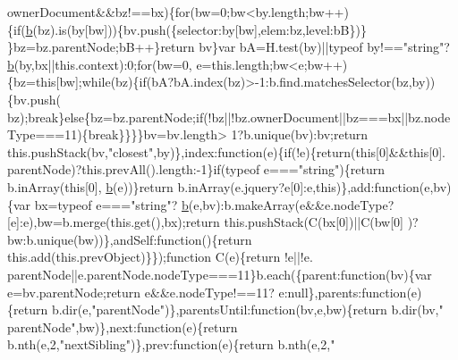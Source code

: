 \begin{DoxyCode}
{      ownerDocument&&bz!==bx)\{\textcolor{keywordflow}{for}(bw=0;bw<by.length;bw++)\{\textcolor{keywordflow}{if}(\hyperlink{jquery_8js_aa4026ad5544b958e54ce5e106fa1c805}{b}(bz).is(by[bw]))\{bv.push(\{selector:by[bw],elem:bz,level:bB\})\}
      \}bz=bz.parentNode;bB++\}\textcolor{keywordflow}{return} bv\}var bA=H.test(by)||typeof by!==\textcolor{stringliteral}{"string"}?\hyperlink{jquery_8js_aa4026ad5544b958e54ce5e106fa1c805}{b}(by,bx||this.context):0;\textcolor{keywordflow}{for}(bw=0,
      e=this.length;bw<e;bw++)\{bz=\textcolor{keyword}{this}[bw];\textcolor{keywordflow}{while}(bz)\{\textcolor{keywordflow}{if}(bA?bA.index(bz)>-1:b.find.matchesSelector(bz,by))\{bv.push(
      bz);\textcolor{keywordflow}{break}\}\textcolor{keywordflow}{else}\{bz=bz.parentNode;\textcolor{keywordflow}{if}(!bz||!bz.ownerDocument||bz===bx||bz.nodeType===11)\{\textcolor{keywordflow}{break}\}\}\}\}bv=bv.length>
      1?b.unique(bv):bv;\textcolor{keywordflow}{return} this.pushStack(bv,\textcolor{stringliteral}{"closest"},by)\},index:\textcolor{keyword}{function}(e)\{\textcolor{keywordflow}{if}(!e)\{\textcolor{keywordflow}{return}(\textcolor{keyword}{this}[0]&&\textcolor{keyword}{this}[0].
      parentNode)?this.prevAll().length:-1\}\textcolor{keywordflow}{if}(typeof e===\textcolor{stringliteral}{"string"})\{\textcolor{keywordflow}{return} b.inArray(\textcolor{keyword}{this}[0],
      \hyperlink{jquery_8js_aa4026ad5544b958e54ce5e106fa1c805}{b}(e))\}\textcolor{keywordflow}{return} b.inArray(e.jquery?e[0]:e,\textcolor{keyword}{this})\},add:\textcolor{keyword}{function}(e,bv)\{var bx=typeof e===\textcolor{stringliteral}{"string"}?
      \hyperlink{jquery_8js_aa4026ad5544b958e54ce5e106fa1c805}{b}(e,bv):b.makeArray(e&&e.nodeType?[e]:e),bw=b.merge(this.\textcolor{keyword}{get}(),bx);\textcolor{keywordflow}{return} this.pushStack(C(bx[0])||C(bw[0]
      )?bw:b.unique(bw))\},andSelf:\textcolor{keyword}{function}()\{\textcolor{keywordflow}{return} this.add(this.prevObject)\}\});\textcolor{keyword}{function} C(e)\{\textcolor{keywordflow}{return} !e||!e.
      parentNode||e.parentNode.nodeType===11\}b.each(\{parent:\textcolor{keyword}{function}(bv)\{var e=bv.parentNode;\textcolor{keywordflow}{return} e&&e.nodeType!==11?
      e:null\},parents:\textcolor{keyword}{function}(e)\{\textcolor{keywordflow}{return} b.dir(e,\textcolor{stringliteral}{"parentNode"})\},parentsUntil:\textcolor{keyword}{function}(bv,e,bw)\{\textcolor{keywordflow}{return} b.dir(bv,\textcolor{stringliteral}{"
      parentNode"},bw)\},next:\textcolor{keyword}{function}(e)\{\textcolor{keywordflow}{return} b.nth(e,2,\textcolor{stringliteral}{"nextSibling"})\},prev:\textcolor{keyword}{function}(e)\{\textcolor{keywordflow}{return} b.nth(e,2,\textcolor{stringliteral}{"
}}
\end{DoxyCode}
